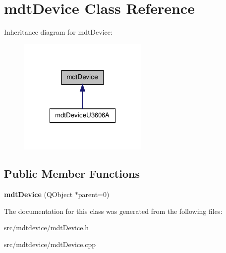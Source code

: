 \hypertarget{classmdt_device}{
\section{mdtDevice Class Reference}
\label{classmdt_device}
}


Inheritance diagram for mdtDevice:\nopagebreak
\begin{figure}[H]
\begin{center}
\leavevmode
\includegraphics[width=178pt]{classmdt_device__inherit__graph}
\end{center}
\end{figure}
\subsection*{Public Member Functions}
\begin{DoxyCompactItemize}
\item 
\hypertarget{classmdt_device_a6d501791e7243358cc61b144254b80db}{
{\bfseries mdtDevice} (QObject $\ast$parent=0)}
\label{classmdt_device_a6d501791e7243358cc61b144254b80db}

\end{DoxyCompactItemize}


The documentation for this class was generated from the following files:\begin{DoxyCompactItemize}
\item 
src/mdtdevice/mdtDevice.h\item 
src/mdtdevice/mdtDevice.cpp\end{DoxyCompactItemize}
